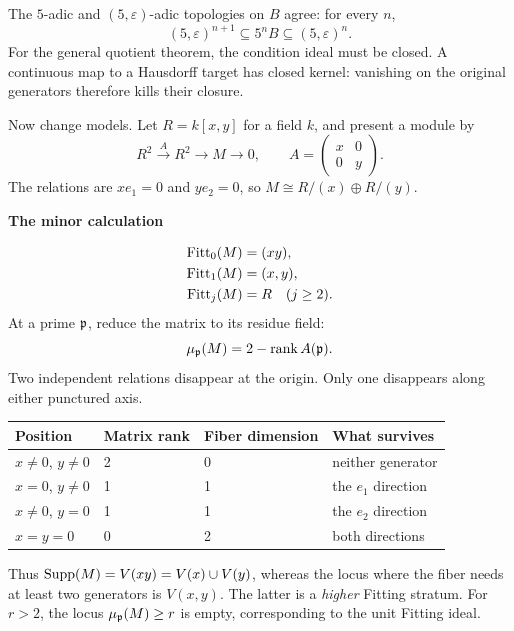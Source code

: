 The $5$-adic and $(5,\varepsilon)$-adic topologies on $B$ agree: for every $n$,
\[
(5,\varepsilon)^{n+1}\subseteq 5^nB\subseteq(5,\varepsilon)^n.
\]
For the general quotient theorem, the condition ideal must be closed. A continuous map to a Hausdorff target has closed kernel: vanishing on the original generators therefore kills their closure.



Now change models. Let $R=k[x,y]$ for a field $k$, and present a module by
\[
R^2\xrightarrow{A}R^2\longrightarrow M\longrightarrow0,
\qquad
A=\begin{pmatrix}x&0\\0&y\end{pmatrix}.
\]
The relations are $xe_1=0$ and $ye_2=0$, so $M\cong R/(x)\oplus R/(y)$.

\begin{minipage}[c]{.48\linewidth}
\end{minipage}\hfill
\begin{minipage}[c]{.48\linewidth}
{\sffamily\bfseries The minor calculation}\par
\[
\begin{aligned}
\operatorname{Fitt}_0(M)&=(xy),\\
\operatorname{Fitt}_1(M)&=(x,y),\\
\operatorname{Fitt}_j(M)&=R\quad(j\ge2).
\end{aligned}
\]
At a prime $\mathfrak p$, reduce the matrix to its residue field:
\[
\mu_{\mathfrak p}(M)=2-\operatorname{rank} A(\mathfrak p).
\]
Two independent relations disappear at the origin. Only one disappears along either punctured axis.
\end{minipage}

\begin{center}\small
\begin{tabular}{@{}llll@{}}\toprule
Position & Matrix rank & Fiber dimension & What survives\\\midrule
$x\ne0$, $y\ne0$ & 2 & 0 & neither generator\\
$x=0$, $y\ne0$ & 1 & 1 & the $e_1$ direction\\
$x\ne0$, $y=0$ & 1 & 1 & the $e_2$ direction\\
$x=y=0$ & 0 & 2 & both directions\\\bottomrule
\end{tabular}
\end{center}
Thus $\operatorname{Supp}(M)=V(xy)=V(x)\cup V(y)$, whereas the locus where the fiber needs at least two generators is $V(x,y)$. The latter is a \emph{higher} Fitting stratum. For $r>2$, the locus $\mu_{\mathfrak p}(M)\ge r$ is empty, corresponding to the unit Fitting ideal.

